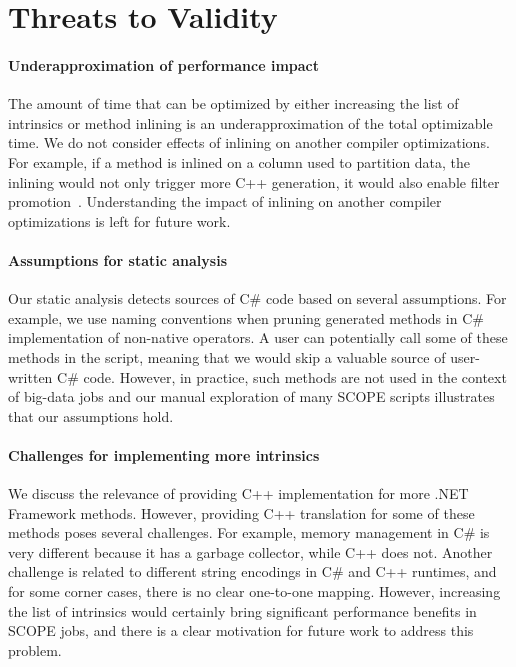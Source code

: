 \section{Threats to Validity}

\paragraph{Underapproximation of performance impact}
The amount of time that can be optimized by either increasing the list of intrinsics or method inlining is an underapproximation of the total optimizable time.
We do not consider effects of inlining on another compiler optimizations.
For example, if a method is inlined on a column used to partition data, the inlining would not only trigger more C++ generation, it would also enable filter promotion~\cite{Darlington78}.
Understanding the impact of inlining on another compiler optimizations is left for future work.

\paragraph{Assumptions for static analysis}
Our static analysis detects sources of C\# code based on several assumptions.
For example, we use naming conventions when pruning generated methods in C\# implementation of non-native operators.
A user can potentially call some of these methods in the script, meaning that we would skip a valuable source of user-written C\# code.
However, in practice, such methods are not used in the context of big-data jobs and our manual exploration of many SCOPE scripts illustrates that our assumptions hold.

\paragraph{Challenges for implementing more intrinsics}
We discuss the relevance of providing C++ implementation for more .NET Framework methods.
However, providing C++ translation for some of these methods poses several challenges.
For example, memory management in C\# is very different because it has a garbage collector, while C++ does not.
Another challenge is related to different string encodings in C\# and C++ runtimes, and for some corner cases, there is no clear one-to-one mapping.
However, increasing the list of intrinsics would certainly bring significant performance benefits in SCOPE jobs, and there is a clear motivation for future work to address this problem.  
